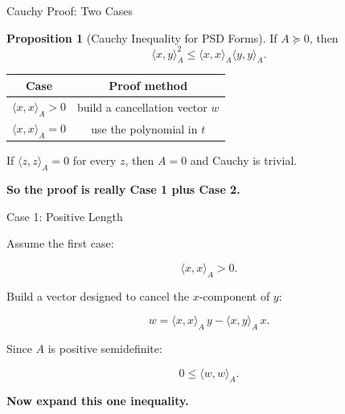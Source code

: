 \documentclass[10pt]{beamer}
\theoremstyle{definition}
\newtheorem{prop}{Proposition}[section]
\newcommand{\x}[1]{\alert{\textbf{#1}}}
\begin{document}
\begin{frame}{Cauchy Proof: Two Cases}

\begin{prop}[Cauchy Inequality for PSD Forms]
If $A\succeq0$, then
$$
\boxed{\langle x,y\rangle_A^2
\le
\langle x,x\rangle_A\langle y,y\rangle_A.}
$$
\end{prop}

\vfill

\begin{center}
\renewcommand{\arraystretch}{1.35}
\begin{tabular}{c|c}
\textbf{Case} & \textbf{Proof method}\\
\hline
$\langle x,x\rangle_A>0$ & build a cancellation vector $w$\\
$\langle x,x\rangle_A=0$ & use the polynomial in $t$
\end{tabular}
\end{center}

\vfill

If $\langle z,z\rangle_A=0$ for every $z$, then $A=0$ and Cauchy is trivial.

\vfill

\begin{center}
\x{So the proof is really Case 1 plus Case 2.}
\end{center}

\end{frame}


\begin{frame}{Case 1: Positive Length}

Assume the first case:

$$
\langle x,x\rangle_A>0.
$$

\vfill

Build a vector designed to cancel the $x$-component of $y$:

$$
w=\langle x,x\rangle_A\,y-\langle x,y\rangle_A\,x.
$$

\vfill

Since $A$ is positive semidefinite:

$$
0\le \langle w,w\rangle_A.
$$

\vfill

\begin{center}
\x{Now expand this one inequality.}
\end{center}

\end{frame}
\end{document}
